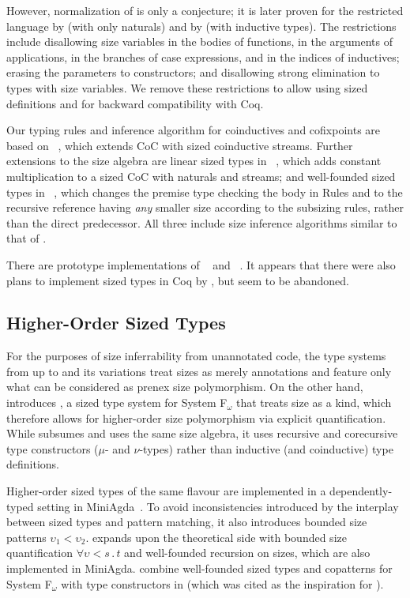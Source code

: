 However, normalization of \CIChat is only a conjecture; it is later proven for the restricted language \CIChatminus by \citet{cic-hat-minus-nat} (with only naturals) and by \citet{cic-hat-minus} (with inductive types).
The restrictions include disallowing size variables in the bodies of functions, in the arguments of applications, in the branches of case expressions, and in the indices of inductives; erasing the parameters to constructors; and disallowing strong elimination to types with size variables.
We remove these restrictions to allow using sized definitions and for backward compatibility with Coq.

Our typing rules and inference algorithm for coinductives and cofixpoints are based on \CChatomega~\citep{cc-hat-omega},
which extends CoC with sized coinductive streams.
Further extensions to the size algebra are linear sized types in \CIChatl~\citep{cic-hat-l},
which adds constant multiplication to a sized CoC with naturals and streams;
and well-founded sized types in \CIChatsub~\citep{wellfounded},
which changes the premise type checking the \cofixpoint body in Rules  and 
to the recursive reference having \emph{any} smaller size according to the subsizing rules,
rather than the direct predecessor.
All three include size inference algorithms similar to that of \CIChat.

There are prototype implementations of \CIChatminus~\citep{cicminus} and \CIChatsub~\citep{cic-wf}.
It appears that there were also plans to implement sized types in Coq by \citet{coq-hat}, but seem to be abandoned.

\subsection{Higher-Order Sized Types}

For the purposes of size inferrability from unannotated code,
the type systems from \lambdahat up to \CIChat and its variations treat sizes as merely annotations
and feature only what can be considered as prenex size polymorphism.
On the other hand, \citet{abel-diss} introduces \Fomegahat, a sized type system for System F$_\omega$ that treats size as a kind,
which therefore allows for higher-order size polymorphism via explicit quantification.
While \Fomegahat subsumes \Fhat and uses the same size algebra,
it uses recursive and corecursive type constructors ($\mu$- and $\nu$-types) rather than inductive (and coinductive) type definitions.

Higher-order sized types of the same flavour are implemented in a dependently-typed setting in MiniAgda~\citep{miniagda}.
To avoid inconsistencies introduced by the interplay between sized types and pattern matching,
it also introduces bounded size patterns \mbox{$\upsilon_1 < \upsilon_2$}.
\citet{flationary} expands upon the theoretical side with bounded size quantification \mbox{$\forall \upsilon \mathrel{<} s\mathpunct{.} t$} and well-founded recursion on sizes,
which are also implemented in MiniAgda.
\citet{f-omega-cop} combine well-founded sized types and copatterns for System F$_\omega$ with \corecursive type constructors in \Fomegacop (which was cited as the inspiration for \CIChatsub).

